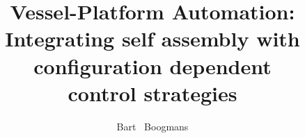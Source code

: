 \documentclass[whitelogo]{tudelft-report}
\begin{document}
	
	\frontmatter
	
	\title[tudelft-white]{Vessel-Platform Automation: \\[12pt] Integrating self assembly with \\[8pt] configuration dependent \\[8pt] control strategies}
	
	\author[tudelft-white]{Bart \ Boogmans}
	
	\makecover[split]
	
	
	
	
	
	
	
	
	
	
	\newpage
	\tableofcontents
	
	
	\mainmatter
	
	
	
	
	
	
	

	

\appendix



	
\end{document}
